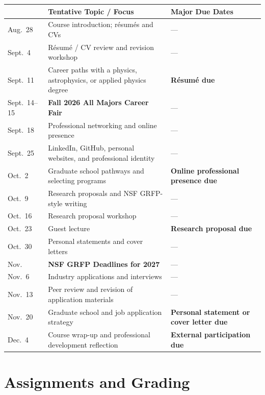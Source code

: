 \documentclass[11pt]{article}
\newcommand{\dash}{---}
\begin{document}
\renewcommand{\arraystretch}{1.15}
\begin{center}
\begin{tabularx}{\textwidth}{
    >{\RaggedRight\arraybackslash}p{}
    >{\RaggedRight\arraybackslash}X
    >{\RaggedRight\arraybackslash}p{}
}
\toprule
{Date} & {Tentative Topic / Focus} & {Major Due Dates} \\
\midrule
Aug.~28 & Course introduction; r\'esum\'es and CVs & \dash \\
Sept.~4 & R\'esum\'e / CV review and revision workshop & \dash \\
Sept.~11 & Career paths with a physics, astrophysics, or applied physics degree & \textbf{R\'esum\'e due} \\
Sept.~14--15 & \textbf{Fall 2026 All Majors Career Fair} & \dash \\
Sept.~18 & Professional networking and online presence & \dash \\
Sept.~25 & LinkedIn, GitHub, personal websites, and professional identity & \dash \\
Oct.~2 & Graduate school pathways and selecting programs & \textbf{Online professional presence due} \\
Oct.~9 & Research proposals and NSF GRFP-style writing & \dash \\
Oct.~16 & Research proposal workshop & \dash \\
Oct.~23 & Guest lecture & \textbf{Research proposal due} \\
Oct.~30 & Personal statements and cover letters & \dash \\
Nov. & \textbf{NSF GRFP Deadlines for 2027} & \dash \\
Nov.~6 & Industry applications and interviews & \dash \\
Nov.~13 & Peer review and revision of application materials & \dash \\
Nov.~20 & Graduate school and job application strategy & \textbf{Personal statement or cover letter due} \\
Dec.~4 & Course wrap-up and professional development reflection & \textbf{External participation due} \\
\bottomrule
\end{tabularx}
\end{center}
\renewcommand{\arraystretch}{1.0}

\section*{Assignments and Grading}
\end{document}
